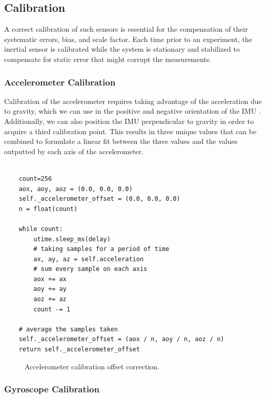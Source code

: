 \subsection{Calibration}

A correct calibration of such sensors is essential for the compensation of their systematic errors, bias, and scale factor. Each time prior to an experiment, the inertial sensor is calibrated while the system is stationary and stabilized to compensate for static error that might corrupt the measurements.

\subsubsection{Accelerometer Calibration}

Calibration of the accelerometer requires taking advantage of the acceleration due to gravity, which we can use in the positive and negative orientation of the IMU \cite{won2009triaxial}. Additionally, we can also position the IMU perpendicular to gravity in order to acquire a third calibration point. This results in three unique values that can be combined to formulate a linear fit between the three values and the values outputted by each axis of the accelerometer.

\lstset{language=Python}
\begin{lstlisting}[frame=single]  % Start your code-block

    count=256
    aox, aoy, aoz = (0.0, 0.0, 0.0)
    self._accelerometer_offset = (0.0, 0.0, 0.0)
    n = float(count)

    while count:
        utime.sleep_ms(delay)
        # taking samples for a period of time
        ax, ay, az = self.acceleration
        # sum every sample on each axis
        aox += ax
        aoy += ay
        aoz += az 
        count -= 1

    # average the samples taken
    self._accelerometer_offset = (aox / n, aoy / n, aoz / n)
    return self._accelerometer_offset
\end{lstlisting}

\begin{figure}[!h]
    \centering
    \resizebox{0.8\linewidth}{!}{}
    \caption{Accelerometer calibration offset correction.}
\end{figure}

\subsubsection{Gyroscope Calibration}

